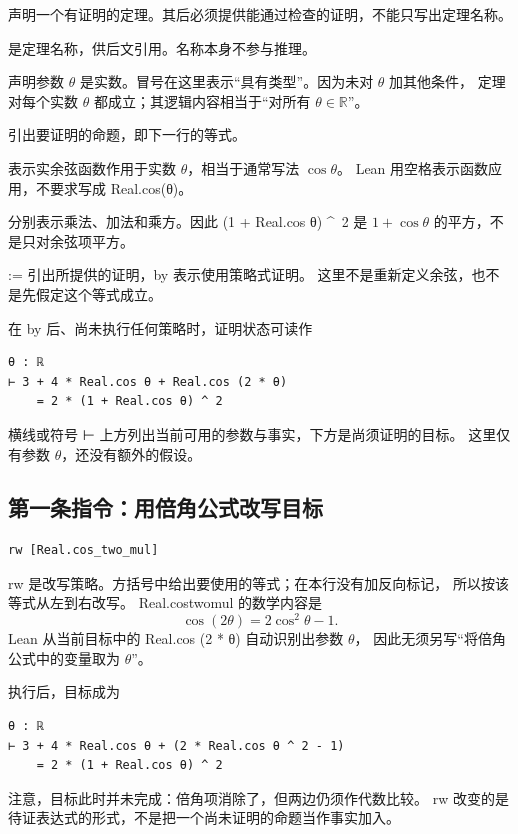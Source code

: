 \documentclass[UTF8,fontset=fandol,a4paper,11pt]{ctexart}
\newcommand{\code}[1]{{\small\ttfamily\def\_{\textunderscore\allowbreak}#1}}
\newcommand{\step}[1]{\Needspace{7\baselineskip}\subsection{#1}}
\begin{document}
\begin{description}[style=nextline,leftmargin=1.5em]
  \item[\code{theorem}]
  声明一个有证明的定理。其后必须提供能通过检查的证明，不能只写出定理名称。
  \item[\code{three\_four\_one\_identity}]
  是定理名称，供后文引用。名称本身不参与推理。
  \item[\code{(θ : ℝ)}]
  声明参数 $\theta$ 是实数。冒号在这里表示“具有类型”。因为未对 $\theta$ 加其他条件，
  定理对每个实数 $\theta$ 都成立；其逻辑内容相当于“对所有 $\theta\in\mathbb R$”。
  \item[参数之后的冒号]
  引出要证明的命题，即下一行的等式。
  \item[\code{Real.cos θ}]
  表示实余弦函数作用于实数 $\theta$，相当于通常写法 $\cos\theta$。
  Lean 用空格表示函数应用，不要求写成 \code{Real.cos(θ)}。
  \item[\code{*}、\code{+} 与 \code{\textasciicircum}]
  分别表示乘法、加法和乘方。因此 \code{(1 + Real.cos θ) \textasciicircum\ 2}
  是 $1+\cos\theta$ 的平方，不是只对余弦项平方。
  \item[\code{:= by}]
  \code{:=} 引出所提供的证明，\code{by} 表示使用策略式证明。
  这里不是重新定义余弦，也不是先假定这个等式成立。
\end{description}

在 \code{by} 后、尚未执行任何策略时，证明状态可读作
\begin{Verbatim}
θ : ℝ
⊢ 3 + 4 * Real.cos θ + Real.cos (2 * θ)
    = 2 * (1 + Real.cos θ) ^ 2
\end{Verbatim}
横线或符号 \code{⊢} 上方列出当前可用的参数与事实，下方是尚须证明的目标。
这里仅有参数 $\theta$，还没有额外的假设。

\step{第一条指令：用倍角公式改写目标}
\begin{Verbatim}
rw [Real.cos_two_mul]
\end{Verbatim}
\code{rw} 是改写策略。方括号中给出要使用的等式；在本行没有加反向标记，
所以按该等式从左到右改写。
\code{Real.cos\_two\_mul} 的数学内容是
\[
  \cos(2\theta)=2\cos^2\theta-1.
\]
Lean 从当前目标中的 \code{Real.cos (2 * θ)} 自动识别出参数 $\theta$，
因此无须另写“将倍角公式中的变量取为 $\theta$”。

执行后，目标成为
\begin{Verbatim}
θ : ℝ
⊢ 3 + 4 * Real.cos θ + (2 * Real.cos θ ^ 2 - 1)
    = 2 * (1 + Real.cos θ) ^ 2
\end{Verbatim}
注意，目标此时并未完成：倍角项消除了，但两边仍须作代数比较。
\code{rw} 改变的是待证表达式的形式，不是把一个尚未证明的命题当作事实加入。
\end{document}
